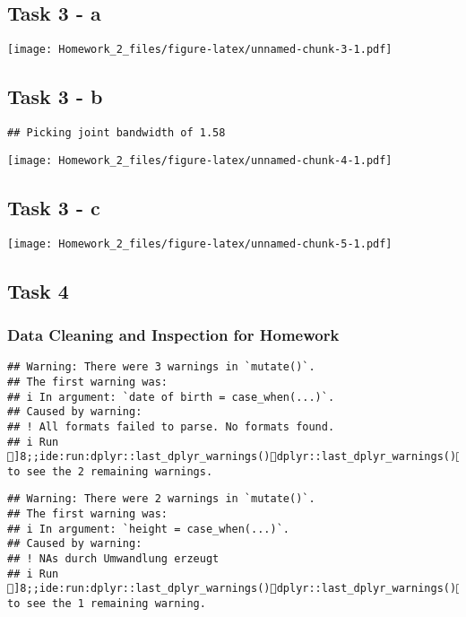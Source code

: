 \documentclass[
]{article}
\begin{document}
\subsection{Task 3 - a}\label{task-3---a}

\texttt{[image: Homework\_2\_files/figure-latex/unnamed-chunk-3-1.pdf]}

\subsection{Task 3 - b}\label{task-3---b}

\begin{verbatim}
## Picking joint bandwidth of 1.58
\end{verbatim}

\texttt{[image: Homework\_2\_files/figure-latex/unnamed-chunk-4-1.pdf]}

\subsection{Task 3 - c}\label{task-3---c}

\texttt{[image: Homework\_2\_files/figure-latex/unnamed-chunk-5-1.pdf]}

\subsection{Task 4}\label{task-4}

\subsubsection{Data Cleaning and Inspection for
Homework}\label{data-cleaning-and-inspection-for-homework}

\begin{verbatim}
## Warning: There were 3 warnings in `mutate()`.
## The first warning was:
## i In argument: `date of birth = case_when(...)`.
## Caused by warning:
## ! All formats failed to parse. No formats found.
## i Run ]8;;ide:run:dplyr::last_dplyr_warnings()dplyr::last_dplyr_warnings()]8;; to see the 2 remaining warnings.
\end{verbatim}

\begin{verbatim}
## Warning: There were 2 warnings in `mutate()`.
## The first warning was:
## i In argument: `height = case_when(...)`.
## Caused by warning:
## ! NAs durch Umwandlung erzeugt
## i Run ]8;;ide:run:dplyr::last_dplyr_warnings()dplyr::last_dplyr_warnings()]8;; to see the 1 remaining warning.
\end{verbatim}
\end{document}
